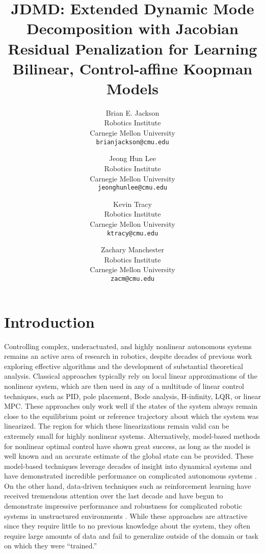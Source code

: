 \documentclass{article}
\title{JDMD: Extended Dynamic Mode Decomposition with Jacobian Residual Penalization
for Learning Bilinear, Control-affine Koopman Models}
\author{
Brian E. Jackson \\
Robotics Institute \\
Carnegie Mellon University\\
\texttt{brianjackson@cmu.edu} \\
\and
Jeong Hun Lee \\
Robotics Institute\\
Carnegie Mellon University\\
\texttt{jeonghunlee@cmu.edu} \\
\and
Kevin Tracy \\
Robotics Institute\\
Carnegie Mellon University\\
\texttt{ktracy@cmu.edu} \\
\and
Zachary Manchester \\
Robotics Institute\\
Carnegie Mellon University\\
\texttt{zacm@cmu.edu} \\
}
\begin{document}
\maketitle


\section{Introduction}

Controlling complex, underactuated, and highly nonlinear autonomous systems remains an
active area of research in robotics, despite decades of previous work exploring
effective algorithms and the development of substantial theoretical analysis. Classical
approaches typically rely on local linear approximations of the nonlinear system, which
are then used in any of a multitude of linear control techniques, such as PID, pole
placement, Bode analysis, H-infinity, LQR, or linear MPC.  These approaches only work
well if the states of the system always remain close to the equilibrium point or
reference trajectory about which the system was linearized. The region for which these
linearizations remain valid can be extremely small for highly nonlinear systems.
Alternatively, model-based methods for nonlinear optimal control have shown great
success, as long as the model is well known and an accurate estimate of the global state
can be provided. These model-based techniques leverage decades of insight into
dynamical systems and have demonstrated incredible performance on complicated
autonomous systems 
\cite{farshidian_efficient_2017,Kuindersma2014,Bjelonic2021,Subosits2019} .  On the
other hand, data-driven techniques such as reinforcement learning have received
tremendous attention over the last decade and have begun to demonstrate impressive
performance and robustness for complicated robotic systems in unstructured environments
\cite{Karnchanachari2020,Hoeller2020,Li2021}. While these approaches are attractive
since they require little to no previous knowledge about the system, they often require
large amounts of data and fail to generalize outside of the domain or task on which they
were ``trained.''
\end{document}
